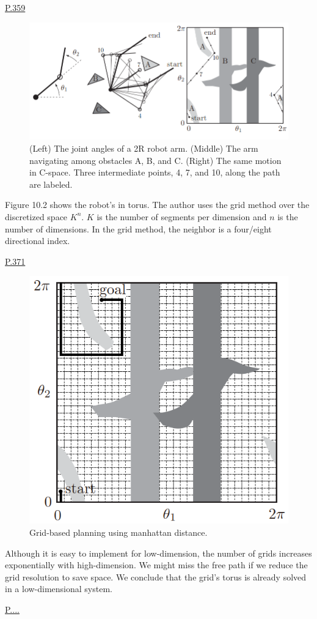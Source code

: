 \noindent \underline{P.359}

\begin{figure}[htbp]
    \centering
    \includegraphics[width=0.7\linewidth]{src/torus/modern_fig1.png}
    \caption{(Left) The joint angles of a 2R robot arm. (Middle) The arm navigating among obstacles A, B, and C. (Right) The same motion in C-space. Three intermediate points, 4, 7, and 10, along the path are labeled.}
\end{figure}

Figure 10.2 shows the robot's \cs in torus. The author uses the grid method over the discretized space $K^n$. $K$ is the number of segments per dimension and $n$ is the number of dimensions. In the grid method, the neighbor is a four/eight directional index.

\noindent \underline{ P.371}

\begin{figure}
    \centering
    \includegraphics[width=0.5\linewidth]{src/torus/modern_fig2.png}
    \caption{Grid-based planning using manhattan distance.}
\end{figure}

Although it is easy to implement for low-dimension, the number of grids increases exponentially with high-dimension. We might miss the free path if we reduce the grid resolution to save space. We conclude that the grid's torus is already solved in a low-dimensional system.

\noindent \underline{P....}


